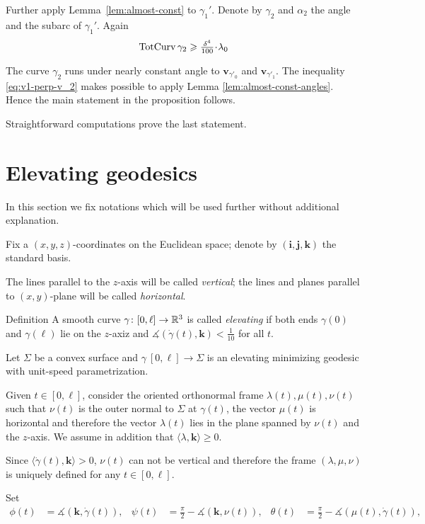 \documentclass[a4paper,10pt]{amsart}
\begin{document}
Further apply Lemma~\ref{lem:almost-const} to $\gamma_1'$.
Denote by $\gamma_2$ and $\alpha_2$ the angle and the subarc of $\gamma_1'$.
Again
\[\tc\gamma_2\ge\tfrac{\delta^4}{100}\cdot\lambda_0\]


The curve $\gamma_2$ runs under nearly constant angle to  $\bm{v}_{\gamma'_0}$ and $\bm{v}_{\gamma'_1}$.
The inequality \ref{eq:v1-perp-v_2}
makes possible to apply Lemma \ref{lem:almost-const-angles}.
Hence the main statement in the proposition follows.

Straightforward computations prove the last statement.
\qeds



\section{Elevating geodesics}\label{sec:elevating}

In this section we fix notations which will be used further 
without additional explanation.

Fix a $(x,y,z)$-coordinates on the Euclidean space;
denote by $(\bm{i},\bm{j},\bm{k})$
the standard basis.

The lines parallel to the $z$-axis will be called \emph{vertical};
the lines and planes parallel to $(x,y)$-plane will be called \emph{horizontal}.

\begin{thm}{Definition}
A smooth curve $\gamma\colon[0,\ell]\to\mathbb{R}^3$ 
is called \emph{elevating} if both ends $\gamma(0)$ and $\gamma(\ell)$ lie on the $z$-axiz and 
$\measuredangle(\dot\gamma(t),\bm{k})<\tfrac1{10}$ for all $t$.
\end{thm}

Let $\Sigma$ be a convex surface 
and $\gamma\:[0,\ell]\to \Sigma$ is an elevating minimizing geodesic 
with unit-speed parametrization.

Given $t\in [0,\ell]$, 
consider the oriented orthonormal frame $\lambda(t),\mu(t),\nu(t)$ 
such that $\nu(t)$ is the outer normal to $\Sigma$ at $\gamma(t)$,
the vector $\mu(t)$ is horizontal and therefore the vector $\lambda(t)$ lies in the plane spanned by $\nu(t)$ and the $z$-axis.
We assume in addition that $\langle\lambda,\bm{k}\rangle\ge 0$.

Since $\langle\dot\gamma(t),\bm{k}\rangle>0$, 
$\nu(t)$ can not be vertical 
and therefore the frame $(\lambda,\mu,\nu)$ is uniquely defined for any $t\in[0,\ell]$.

Set 
\begin{align*}
\phi(t)&=\measuredangle(\bm{k},\dot\gamma(t)),&
\psi(t)&=\tfrac\pi2-\measuredangle(\bm{k},\nu(t)),&
\theta(t)&=\tfrac\pi2-\measuredangle(\mu(t),\dot\gamma(t)),
\end{align*}
\end{document}
